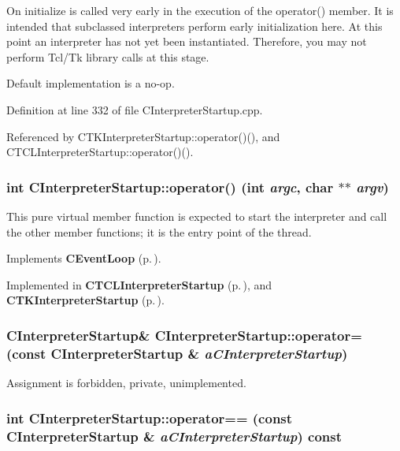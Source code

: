 On initialize is called very early in  the execution of the operator() member. It is intended that subclassed interpreters perform early initialization here. At this point an interpreter has not yet been  instantiated. Therefore, you may not perform Tcl/Tk library calls at this  stage.

Default implementation is a no-op. 

Definition at line 332 of file CInterpreter\-Startup.cpp.

Referenced by CTKInterpreter\-Startup::operator()(), and CTCLInterpreter\-Startup::operator()().
\subsubsection{\setlength{\rightskip}{0pt plus 5cm}int CInterpreter\-Startup::operator() (int {\em argc}, char $\ast$$\ast$ {\em argv})\hspace{0.3cm}{\tt  [private, pure virtual]}}\label{classCInterpreterStartup_c0}


This pure virtual member function is expected to start the interpreter and call the other member functions; it is the entry point of the thread. 

Implements {\bf CEvent\-Loop} {\rm (p.\,\pageref{classCEventLoop_c0})}.

Implemented in {\bf CTCLInterpreter\-Startup} {\rm (p.\,\pageref{classCTCLInterpreterStartup_c0})}, and {\bf CTKInterpreter\-Startup} {\rm (p.\,\pageref{classCTKInterpreterStartup_c3})}.
\subsubsection{\setlength{\rightskip}{0pt plus 5cm}CInterpreter\-Startup\& CInterpreter\-Startup::operator= (const CInterpreter\-Startup \& {\em a\-CInterpreter\-Startup})\hspace{0.3cm}{\tt  [private]}}\label{classCInterpreterStartup_c2}


Assignment is forbidden, private, unimplemented.

\subsubsection{\setlength{\rightskip}{0pt plus 5cm}int CInterpreter\-Startup::operator== (const CInterpreter\-Startup \& {\em a\-CInterpreter\-Startup}) const\hspace{0.3cm}{\tt  [private]}}\label{classCInterpreterStartup_c3}


